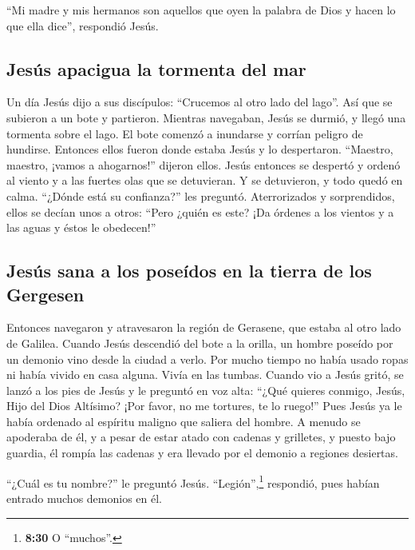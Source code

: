  ``Mi madre y mis hermanos son aquellos que oyen la
palabra de Dios y hacen lo que ella dice'', respondió Jesús.

\hypertarget{jesuxfas-apacigua-la-tormenta-del-mar}{%
\subsection{Jesús apacigua la tormenta del
mar}\label{jesuxfas-apacigua-la-tormenta-del-mar}}

 Un día Jesús dijo a sus discípulos: ``Crucemos al otro
lado del lago''. Así que se subieron a un bote y partieron.
 Mientras navegaban, Jesús se durmió, y llegó una
tormenta sobre el lago. El bote comenzó a inundarse y corrían peligro de
hundirse.  Entonces ellos fueron donde estaba Jesús y lo
despertaron. ``Maestro, maestro, ¡vamos a ahogarnos!'' dijeron ellos.
Jesús entonces se despertó y ordenó al viento y a las fuertes olas que
se detuvieran. Y se detuvieron, y todo quedó en calma. 
``¿Dónde está su confianza?'' les preguntó. Aterrorizados y
sorprendidos, ellos se decían unos a otros: ``Pero ¿quién es este? ¡Da
órdenes a los vientos y a las aguas y éstos le obedecen!''

\hypertarget{jesuxfas-sana-a-los-poseuxeddos-en-la-tierra-de-los-gergesen}{%
\subsection{Jesús sana a los poseídos en la tierra de los
Gergesen}\label{jesuxfas-sana-a-los-poseuxeddos-en-la-tierra-de-los-gergesen}}

 Entonces navegaron y atravesaron la región de Gerasene,
que estaba al otro lado de Galilea.  Cuando Jesús
descendió del bote a la orilla, un hombre poseído por un demonio vino
desde la ciudad a verlo. Por mucho tiempo no había usado ropas ni había
vivido en casa alguna. Vivía en las tumbas.  Cuando vio a
Jesús gritó, se lanzó a los pies de Jesús y le preguntó en voz alta:
``¿Qué quieres conmigo, Jesús, Hijo del Dios Altísimo? ¡Por favor, no me
tortures, te lo ruego!''  Pues Jesús ya le había ordenado
al espíritu maligno que saliera del hombre. A menudo se apoderaba de él,
y a pesar de estar atado con cadenas y grilletes, y puesto bajo guardia,
él rompía las cadenas y era llevado por el demonio a regiones desiertas.

 ``¿Cuál es tu nombre?'' le preguntó Jesús.
``Legión'',\footnote{\textbf{8:30} O ``muchos''.} respondió, pues habían
entrado muchos demonios en él.

